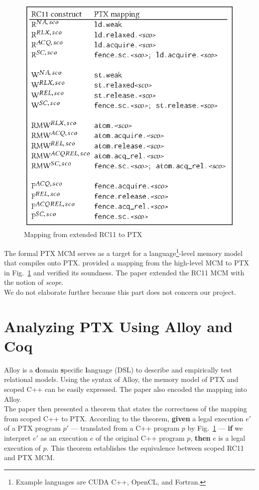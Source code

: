 \documentclass[11pt,a4paper]{article}
\begin{document}
\begin{figure}[H]
    \centering
    \includegraphics[width=0.75\linewidth]{img/mapping.eps}
    \caption{Mapping from extended RC11 \cite{rc11} to PTX}
    \label{fig:mapping}
\end{figure}

The formal PTX MCM serves as a target for a language\footnote{Example languages are CUDA C++, OpenCL, and Fortran.}-level memory model that compiles onto PTX. \cite{10.1145/3297858.3304043} provided a mapping from the high-level MCM to PTX in Fig.~\ref{fig:mapping} and verified its soundness. The paper extended the RC11 MCM \cite{rc11} with the notion of \textit{scope}.\\

We do not elaborate further because this part does not concern our project.

\section{Analyzing PTX Using Alloy and Coq}

Alloy \cite{alloy} is a \textbf{d}omain \textbf{s}pecific \textbf{l}anguage (DSL) to describe and empirically test relational models. Using the syntax of Alloy, the memory model of PTX and scoped C++ can be easily expressed. The paper also encoded the mapping into Alloy.\\

The paper then presented a theorem that states the correctness of the mapping from scoped C++ to PTX. According to the theorem, \textbf{given} a legal execution $e'$ of a PTX program $p'$ --- translated from a C++ program $p$ by Fig.~\ref{fig:mapping} --- \textbf{if} we interpret $e'$ as an execution $e$ of the original C++ program $p$, \textbf{then} $e$ is a legal execution of $p$. This theorem establishes the equivalence between scoped RC11 and PTX MCM.\\
\end{document}
